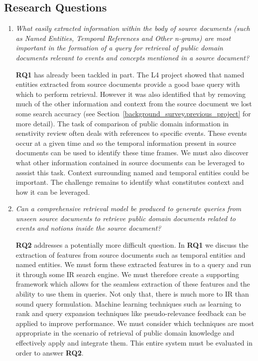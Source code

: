\documentclass{mprop}
\begin{document}
\subsection{Research Questions}
\begin{enumerate}[label=\textbf{RQ.\arabic*}]
\item \textit{What easily extracted information within the body of source documents (such as Named Entities, Temporal References and Other n-grams) are most important in the formation of a query for retrieval of public domain documents relevant to events and concepts mentioned in a source document? }

\textbf{RQ1} has already been tackled in part. 
The L4 project showed that named entities extracted from source documents provide a good base query with which to perform retrieval. 
However it was also identified that by removing much of the other information and context from the source document we lost some search accuracy (see Section~\ref{background_survey.previous_project} for more detail). 
The task of comparison of public domain information in senstivity review often deals with references to specific events. 
These events occur at a given time and so the temporal information present in source documents can be used to identify these time frames. 
We must also discover what other information contained in source documents can be leveraged to asssist this task.
Context surrounding named and temporal entities could be important. 
The challenge remains to identify what constitutes context and how it can be leveraged.

\item \textit{Can a comprehensive retrieval model be produced to generate queries from unseen source documents to retrieve public domain documents related to events and notions inside the source document?}

\textbf{RQ2} addresses a potentially more difficult question. 
In \textbf{RQ1} we discuss the extraction of features from source documents such as temporal entities and named entities. 
We must form these extracted features in to a query and run it through some IR search engine. 
We must therefore create a supporting framework which allows for the seamless extraction of these features and the ability to use them in queries. 
Not only that, there is much more to IR than sound query formulation. 
Machine learning techniques such as learning to rank and query expansion techniques like pseudo-relevance feedback can be applied to improve performance. 
We must consider which techniques are most appropriate in the scenario of retrieval of public domain knowledge and effectively apply and integrate them. 
This entire system must be evaluated in order to answer \textbf{RQ2}.
\end{enumerate}
\end{document}
